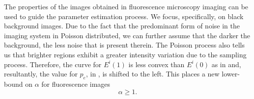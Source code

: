 The properties of the images obtained in fluorescence microscopy imaging can be used to guide the parameter estimation process. We focus, specifically, on black background images. Due to the fact that the predominant form of noise in the imaging system in Poisson distributed, we can further assume that the darker the background, the less noise that is present therein. The Poisson process also tells us that brighter regions exhibit a greater intensity variation due to the sampling process. Therefore, the curve for $E^i(1)$ is less convex than $E^i(0)$ as in  and, resultantly, the value for $p_e$, in , is shifted to the left. This places a new lower-bound on $\alpha$ for fluorescence images
\begin{equation}
	\alpha \geq 1.
	\label{eq:alphalowerboundFM}
\end{equation}

